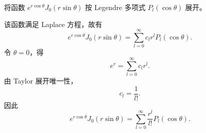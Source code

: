 \begin{question}
将函数 \(e^{r\cos\theta}J_0(r\sin\theta)\) 按 Legendre 多项式 \(P_l(\cos\theta)\) 展开。
\begin{solution}
该函数满足 Laplace 方程，故有
\[
e^{r\cos\theta}J_0(r\sin\theta)
=\sum_{l=0}^{\infty}c_lr^lP_l(\cos\theta).
\]
令 \(\theta=0\)，得
\[
e^r=\sum_{l=0}^{\infty}c_lr^l.
\]
由 Taylor 展开唯一性，
\[
c_l=\frac1{l!}.
\]
因此
\[
e^{r\cos\theta}J_0(r\sin\theta)
=\sum_{l=0}^{\infty}\frac{r^l}{l!}P_l(\cos\theta).
\]
\end{solution}
\end{question}

